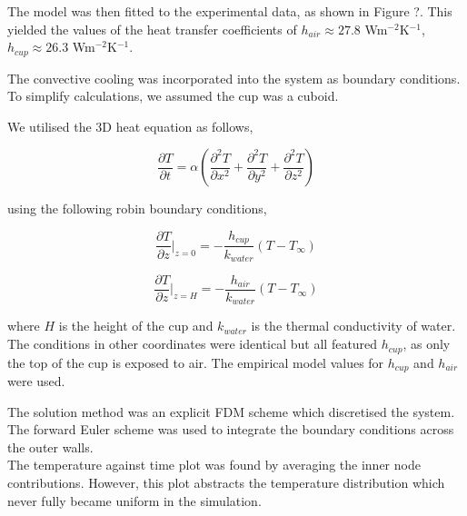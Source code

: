 \documentclass[a0paper,portrait, 3pt]{baposter}
\begin{document}
\begin{poster}
{The model was then fitted to the experimental data, as shown in Figure ?. This yielded the values of the heat transfer coefficients of $h_{air} \approx 27.8$  Wm$^{-2}$K$^{-1}$, $h_{cup} \approx 26.3 $ Wm$^{-2}$K$^{-1}$.

}


{

 The convective cooling was incorporated into the system as boundary conditions. To simplify calculations, we assumed the cup was a cuboid.
 
 We utilised the 3D heat equation as follows, 

\begin{equation}
    \frac{\partial T }{\partial t} = \alpha \left( \frac{\partial^2 T }{\partial x^2} + \frac{\partial^2 T }{\partial y^2} + \frac{\partial^2 T }{\partial z^2} \right)
\end{equation}

using the following robin boundary conditions, 

\begin{equation}
    \frac{\partial T}{\partial z} \Bigr|_{z = 0} = - \frac{h_{cup}}{k_{water}} (T - T_{\infty})
\end{equation}

\begin{equation}
    \frac{\partial T}{\partial z} \Bigr|_{z = H} = - \frac{h_{air}}{k_{water}} (T - T_{\infty})
\end{equation}

where $H$ is the height of the cup and $k_{water}$ is the thermal conductivity of water. The conditions in other coordinates were identical but all featured $h_{cup}$, as only the top of the cup is exposed to air. The empirical model values for $h_{cup}$ and $h_{air}$ were used.

The solution method was an explicit FDM scheme which discretised the system. The forward Euler scheme was used to integrate the boundary conditions across the outer walls. \\
The temperature against time plot was found by averaging the inner node contributions. However, this plot abstracts the temperature distribution which never fully became uniform in the simulation.

}
\end{poster}
\end{document}
